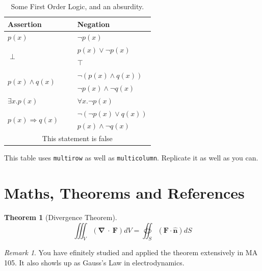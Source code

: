 \documentclass{article}
\newtheorem{theorem}{Theorem}
\theoremstyle{remark}
\newtheorem*{remark}{Remark}
\begin{document}
\begin{table}[H]
    \centering
    \begin{tabular}{lcccc|lcccc}
        \hline
        \textbf{Assertion}& & & & & \textbf{Negation} & & & & \\
        \hline
        \multicolumn{5}{l|}{$p(x)$} & \multicolumn{5}{l}{$\neg p(x)$} \\
        \hline
        \multicolumn{5}{l|}{\multirow{2}{*}{$\perp$}} & \multicolumn{5}{l}{$p(x) \vee \neg p(x)$} \\
        & & & & & $\top$ & & & & \\
        \hline
        \multicolumn{5}{l|}{\multirow{2}{*}{$p(x) \wedge q(x) $}} & \multicolumn{5}{l}{$\neg(p(x) \wedge q(x))$} \\
        & & & & & \multicolumn{5}{l}{$\neg p(x) \wedge \neg q(x)$} \\
        \hline
        \multicolumn{5}{l|}{$\exists x.p(x)$} & \multicolumn{5}{l}{$\forall x.\neg p(x)$} \\
        \hline
        \multicolumn{5}{l|}{\multirow{2}{*}{$p(x) \Rightarrow q(x) $}} & \multicolumn{5}{l}{$\neg(\neg p(x) \vee q(x))$} \\
        & & & & & \multicolumn{5}{l}{$p(x) \wedge \neg q(x)$} \\
        \hline
        \multicolumn{10}{c}{This statement is false} \\
        \hline
    \end{tabular}
    \caption{Some First Order Logic, and an absurdity.}
\end{table}

This table uses \verb!multirow! as well as \verb!multicolumn!. Replicate it as well as you can.

\clearpage

\section{Maths, Theorems and References}

\begin{theorem}[Divergence Theorem]
    \begin{equation*}
        \iiint_V(\boldsymbol{\nabla~\cdot}~\mathbf{F})dV = \oiint_S(\mathbf{F}\cdot \mathbf{\hat n})dS
    \end{equation*}
\end{theorem}

\begin{remark}
    You have efinitely studied and applied the theorem extensively in MA 105. It 
    also showls up as Gauss's Law in electrodynamics.
\end{remark}
\end{document}
